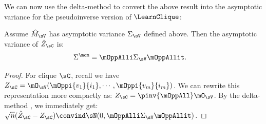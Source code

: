 We can now use the delta-method to convert the above result into 
the asymptotic variance for the pseudoinverse version of $\LearnClique$:
\begin{lemma}
  \label{lem:mom-variance}  
  Assume $\hat M_{\sV}$ has asymptotic variance $\Sigma_\sV$ defined above.
  Then the asymptotic variance of $\hat Z_\sC$ is:
  \begin{align*}
    \Sigma^{\mom} &= \mOppAlli \Sigma_\sV \mOppAllit.
  \end{align*}
\end{lemma}
\begin{proof}
For clique $\sC$, recall we have
  $Z_{\sC} = \mO_\sV(\mOppi{v_1}{i_1},\cdots,\mOppi{v_m}{i_m})$.
We can rewrite this representation more compactly as: $Z_{\sC} = \pinv{\mOppAll} \mO_\sV$.
By the delta-method \cite{vaart98asymptotic},
we immediately get:
$\sqrt{n}(\hat Z_\sC - Z_\sC) \convind \sN(0, \mOppAlli \Sigma_\sV \mOppAllit)$.
\end{proof}

